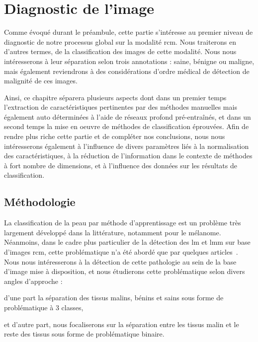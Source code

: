 \renewcommand{\thechapter}{\arabic{chapter}}
\setcounter{chapter}{4}

\chapter{Diagnostic de l'image}
\label{chap:chapter_4}
\chapterintro
Comme évoqué durant le préambule, cette partie s'intéresse au premier niveau de diagnostic de notre processus global sur la modalité \gls{rcm}. Nous traiterons en d'autres termes, de la classification des images de cette modalité. Nous nous intéresserons à leur séparation selon trois annotations : saine, bénigne ou maligne, mais également reviendrons à des considérations d'ordre médical de détection de malignité de ces images.\par

Ainsi, ce chapitre séparera plusieurs aspects dont dans un premier temps l'extraction de caractéristiques pertinentes par des méthodes manuelles mais également auto déterminées à l'aide de réseaux profond pré-entraînés, et dans un second temps la mise en oeuvre de méthodes de classification éprouvées. Afin de rendre plus riche cette partie et de compléter nos conclusions, nous nous intéresserons également à l'influence de divers paramètres liés à la normalisation des caractéristiques, à la réduction de l'information dans le contexte de méthodes à fort nombre de dimensions, et à l'influence des données sur les résultats de classification.\par	
\newpage

\section{Méthodologie}
La classification de la peau par méthode d'apprentissage est un problème très largement développé dans la littérature, notamment pour le mélanome. Néanmoins, dans le cadre plus particulier de la détection des \gls{lm} et \gls{lmm} sur base d'images \gls{rcm}, cette problématique n'a été abordé que par quelques articles~\cite{Halimi2017a, Halimi2017b, Wiltgen2008, Koller2011}. Nous nous intéresserons à la détection de cette pathologie au sein de la base d'image mise à disposition, et nous étudierons cette problématique selon divers angles d'approche : 
\begin{inlinerate}
    \item d'une part la séparation des tissus malins, bénins et sains sous forme de problématique à 3 classes,
    \item et d'autre part, nous focaliserons sur la séparation entre les tissus malin et le reste des tissus sous forme de problématique binaire.
\end{inlinerate}\par

